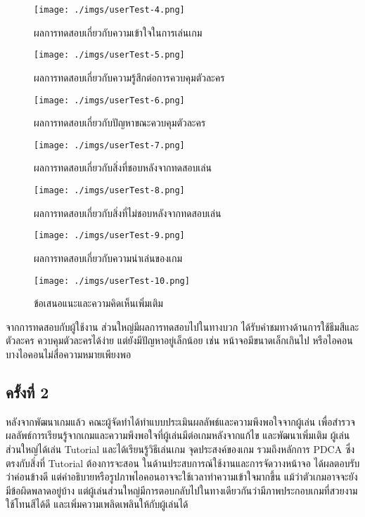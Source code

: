 \documentclass[12pt,oneside,openright,a4paper]{cpe-thai-project}
\begin{document}
  \begin{figure}[H]\centering
    \texttt{[image: ./imgs/userTest-4.png]}
    \caption{ผลการทดสอบเกี่ยวกับความเข้าใจในการเล่นเกม}\label{fig:userTest-4}
  \end{figure}

  \begin{figure}[H]\centering
    \texttt{[image: ./imgs/userTest-5.png]}
    \caption{ผลการทดสอบเกี่ยวกับความรู้สึกต่อการควบคุมตัวละคร}\label{fig:userTest-5}
  \end{figure}

  \begin{figure}[H]\centering
    \texttt{[image: ./imgs/userTest-6.png]}
    \caption{ผลการทดสอบเกี่ยวกับปัญหาขณะควบคุมตัวละคร}\label{fig:userTest-6}
  \end{figure}

  \begin{figure}[H]\centering
    \texttt{[image: ./imgs/userTest-7.png]}
    \caption{ผลการทดสอบเกี่ยวกับสิ่งที่ชอบหลังจากทดสอบเล่น}\label{fig:userTest-7}
  \end{figure}

  \begin{figure}[H]\centering
    \texttt{[image: ./imgs/userTest-8.png]}
    \caption{ผลการทดสอบเกี่ยวกับสิ่งที่ไม่ชอบหลังจากทดสอบเล่น}\label{fig:userTest-8}
  \end{figure}

  \begin{figure}[H]\centering
    \texttt{[image: ./imgs/userTest-9.png]}
    \caption{ผลการทดสอบเกี่ยวกับความน่าเล่นของเกม}\label{fig:userTest-9}
  \end{figure}

  \begin{figure}[H]\centering
    \texttt{[image: ./imgs/userTest-10.png]}
    \caption{ข้อเสนอแนะและความคิดเห็นเพิ่มเติม}\label{fig:userTest-10}
  \end{figure}

  จากการทดสอบกับผู้ใช้งาน ส่วนใหญ่มีผลการทดสอบไปในทางบวก 
  ได้รับคำชมทางด้านการใช้ธีมสีและตัวละคร ควบคุมตัวละครได้ง่าย 
  แต่ยังมีปัญหาอยู่เล็กน้อย เช่น หน้าจอมีขนาดเล็กเกินไป หรือไอคอนบางไอคอนไม่สื่อความหมายเพียงพอ
  
  \pagebreak
  \subsection{ครั้งที่ 2}
  หลังจากพัฒนาเกมแล้ว คณะผู้จัดทำได้ทำแบบประเมินผลลัพธ์และความพึงพอใจจากผู้เล่น
  เพื่อสำรวจผลลัพธ์การเรียนรู้จากเกมและความพึงพอใจที่ผู้เล่นมีต่อเกมหลังจากแก้ไข
  และพัฒนาเพิ่มเติม ผู้เล่นส่วนใหญ่ได้เล่น Tutorial และได้เรียนรู้วิธีเล่นเกม
  จุดประสงค์ของเกม รวมถึงหลักการ PDCA ซึ่งตรงกับสิ่งที่ Tutorial ต้องการจะสอน
  ในด้านประสบการณ์ใช้งานและการจัดวางหน้าจอ ได้ผลตอบรับว่าค่อนข้างดี
  แต่คำอธิบายหรือรูปภาพไอคอนอาจจะใช้เวลาทำความเข้าใจมากขึ้น
  แม้ว่าตัวเกมอาจจะยังมีข้อผิดพลาดอยู่บ้าง
  แต่ผู้เล่นส่วนใหญ่มีการตอบกลับไปในทางเดียวกันว่ามีภาพประกอบเกมที่สวยงาม
  ใช้โทนสีได้ดี และเพิ่มความเพลิดเพลินให้กับผู้เล่นได้
\end{document}
